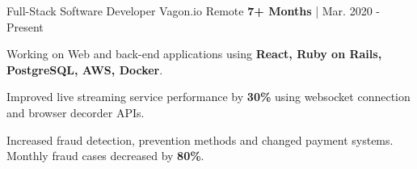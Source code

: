 
\begin{cventries}
  \cventry
   {Full-Stack Software Developer
   } %
    {Vagon.io} %
    {Remote} %
    {\textbf{7+ Months} | Mar. 2020 - Present} %
    {
      \begin{cvitems} %
        \item {Working on Web and back-end applications using \textbf{ React, Ruby on Rails, PostgreSQL, AWS, Docker}.}
		\item {Improved live streaming service performance by \textbf{30\%} using websocket connection and browser decorder APIs.}
		\item {Increased fraud detection, prevention methods and changed payment systems. Monthly fraud cases decreased by \textbf{80\%}.}
      \end{cvitems}
    }


\end{cventries}

